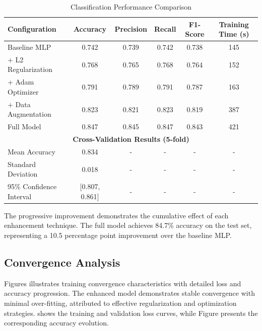 \documentclass[12pt,a4paper]{article}
\begin{document}
	\begin{table}[H]
		\centering
		\caption{Classification Performance Comparison}
		\label{tab:results}
		\begin{tabular}{@{}lccccc@{}}
			\toprule
			Configuration & Accuracy & Precision & Recall & F1-Score & Training Time (s) \\
			\midrule
			Baseline MLP & 0.742 & 0.739 & 0.742 & 0.738 & 145 \\
			+ L2 Regularization & 0.768 & 0.765 & 0.768 & 0.764 & 152 \\
			+ Adam Optimizer & 0.791 & 0.789 & 0.791 & 0.787 & 163 \\
			+ Data Augmentation & 0.823 & 0.821 & 0.823 & 0.819 & 387 \\
			Full Model & 0.847 & 0.845 & 0.847 & 0.843 & 421 \\
			\midrule
			\multicolumn{6}{c}{\textbf{Cross-Validation Results (5-fold)}} \\
			\midrule
			Mean Accuracy & 0.834 & - & - & - & - \\
			Standard Deviation & 0.018 & - & - & - & - \\
			95\% Confidence Interval & [0.807, 0.861] & - & - & - & - \\
			\bottomrule
		\end{tabular}
	\end{table}
	
	The progressive improvement demonstrates the cumulative effect of each enhancement technique. The full model achieves 84.7\% accuracy on the test set, representing a 10.5 percentage point improvement over the baseline MLP.
	
	\subsection{Convergence Analysis}
	
	Figures illustrates training convergence characteristics with detailed loss and accuracy progression. The enhanced model demonstrates stable convergence with minimal over-fitting, attributed to effective regularization and optimization strategies.  shows the training and validation loss curves, while Figure  presents the corresponding accuracy evolution.
	
\end{document}
